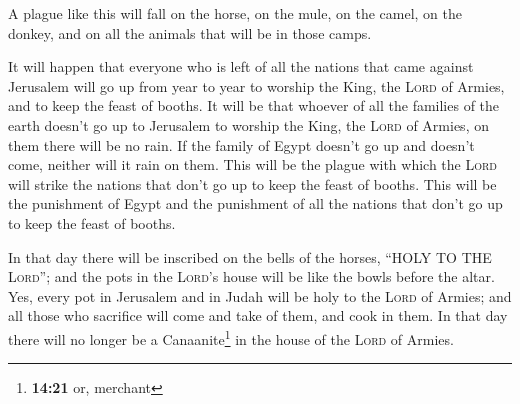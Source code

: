  A plague like this will fall on the horse, on the mule,
on the camel, on the donkey, and on all the animals that will be in
those camps.

 It will happen that everyone who is left of all the
nations that came against Jerusalem will go up from year to year to
worship the King, the \textsc{Lord} of Armies, and to keep the feast of
booths.  It will be that whoever of all the families of
the earth doesn't go up to Jerusalem to worship the King, the
\textsc{Lord} of Armies, on them there will be no rain. 
If the family of Egypt doesn't go up and doesn't come, neither will it
rain on them. This will be the plague with which the \textsc{Lord} will
strike the nations that don't go up to keep the feast of booths.
 This will be the punishment of Egypt and the punishment
of all the nations that don't go up to keep the feast of booths.

 In that day there will be inscribed on the bells of the
horses, ``HOLY TO THE \textsc{Lord}''; and the pots in the
\textsc{Lord}'s house will be like the bowls before the altar.
 Yes, every pot in Jerusalem and in Judah will be holy to
the \textsc{Lord} of Armies; and all those who sacrifice will come and
take of them, and cook in them. In that day there will no longer be a
Canaanite\footnote{\textbf{14:21} or, merchant} in the house of the
\textsc{Lord} of Armies.
